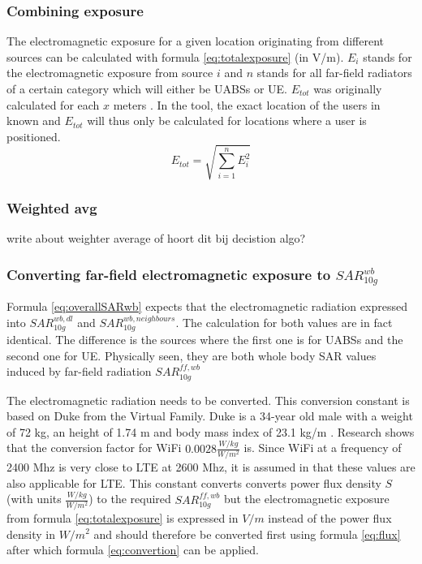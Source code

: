 \subsubsection{Combining exposure}
The electromagnetic exposure for a given location originating from different sources can be calculated with formula \ref{eq:totalexposure} (in V/m). $E_i$ stands for 
the electromagnetic exposure from source $i$ and
$n$ stands for all far-field radiators of a certain category which will either be \gls{UABS}s or \gls{UE}.
$E_{tot}$ was originally calculated for each $x$ meters \cite{J1}. In the tool, the exact location of the users in known and $E_{tot}$ will thus 
only be calculated for locations where a user is positioned.
\begin{equation}
E_{tot} = \sqrt{\sum_{i=1}^{n} E_i^2}
\label{eq:totalexposure}
\end{equation}

\subsubsection{Weighted avg}
write about weighter average of hoort dit bij decistion algo?

\subsubsection{Converting far-field electromagnetic exposure to $SAR^{wb}_{10g}$}
\label{sub:convertDLtosarwb}

Formula \ref{eq:overallSARwb} expects that the electromagnetic radiation expressed into $SAR^{wb,dl}_{10g}$ and $SAR^{wb,neighbours}_{10g}$. The 
calculation for both values are in fact identical. The difference is the sources where the first one is for \gls{UABS}s and the second one for \gls{UE}.
Physically seen, they are both whole body SAR values induced by far-field radiation $SAR^{ff,wb}_{10g}$

The electromagnetic radiation needs to be converted. 
This conversion constant is based on Duke from the Virtual Family. Duke is a 34-year old male with  a weight of 72 kg, an height of 1.74 m and body
mass index of 23.1 kg/m \cite{J22_plets2015joint}. Research shows that the conversion factor for WiFi $0.0028 \frac{W/kg}{W/m^2}$ is.
 Since WiFi at a frequency of 2400 Mhz 
is very close to LTE at 2600 Mhz, it is assumed in \cite{J22_plets2015joint} that these values are also applicable for LTE.
This constant converts converts power flux density $S$ (with units $\frac{W/kg}{W/m^2}$) to the required $SAR^{ff,wb}_{10g}$ but the electromagnetic exposure 
from formula \ref{eq:totalexposure} is expressed in  $V/m$ instead of the power flux density in $W/m^2$ and should therefore be 
converted first using formula \ref{eq:flux} after which formula \ref{eq:convertion} can be applied.

